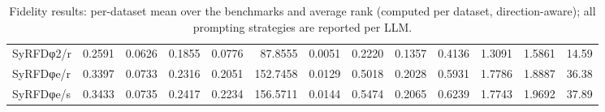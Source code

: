 \begin{table}[t]
\begin{tabular}{lrrrrrrrrrrrr}
SyRFDφ2/r & 0.2591 & 0.0626 & 0.1855 & 0.0776 & 87.8555 & 0.0051 & 0.2220 & 0.1357 & 0.4136 & 1.3091 & 1.5861 & 14.59 \\
SyRFDφe/r & 0.3397 & 0.0733 & 0.2316 & 0.2051 & 152.7458 & 0.0129 & 0.5018 & 0.2028 & 0.5931 & 1.7786 & 1.8887 & 36.38 \\
SyRFDφe/s & 0.3433 & 0.0735 & 0.2417 & 0.2234 & 156.5711 & 0.0144 & 0.5474 & 0.2065 & 0.6239 & 1.7743 & 1.9692 & 37.89 \\
\bottomrule
\end{tabular}
\caption{Fidelity results: per-dataset mean over the benchmarks and average rank (computed per dataset, direction-aware); all prompting strategies are reported per LLM.}
\label{tab:fidelity_main}
\end{table}